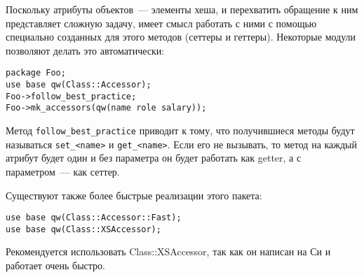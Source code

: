 Поскольку атрибуты объектов~--- элементы хеша, и перехватить обращение к ним представляет сложную задачу, имеет смысл работать с ними с помощью специально созданных для этого методов (сеттеры и геттеры). Некоторые модули позволяют делать это автоматически:
\begin{verbatim}
package Foo;
use base qw(Class::Accessor);
Foo->follow_best_practice;
Foo->mk_accessors(qw(name role salary));
\end{verbatim}
Метод \verb|follow_best_practice| приводит к тому, что получившиеся методы будут называться \verb|set_<name>| и \verb|get_<name>|. Если его не вызывать, то метод на каждый атрибут будет один и без параметра он будет работать как getter, а с параметром~--- как сеттер.

Существуют также более быстрые реализации этого пакета:
\begin{verbatim}
use base qw(Class::Accessor::Fast);
use base qw(Class::XSAccessor);
\end{verbatim}
Рекомендуется использовать Class::XSAccessor, так как он написан на Си и работает очень быстро.

